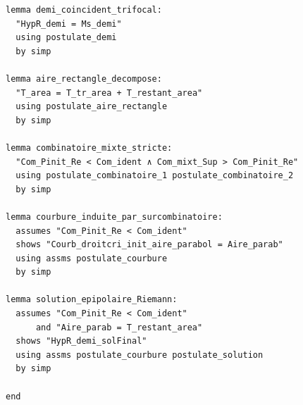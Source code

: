 \documentclass[a4paper,11pt]{article}
\begin{document}
\begin{holcode}[title={\textcolor{white}{Fichier : methode\_spectral.thy -- Partie 1/4}}]
\begin{lstlisting}
lemma demi_coincident_trifocal:
  "HypR_demi = Ms_demi"
  using postulate_demi
  by simp

lemma aire_rectangle_decompose:
  "T_area = T_tr_area + T_restant_area"
  using postulate_aire_rectangle
  by simp

lemma combinatoire_mixte_stricte:
  "Com_Pinit_Re < Com_ident ∧ Com_mixt_Sup > Com_Pinit_Re"
  using postulate_combinatoire_1 postulate_combinatoire_2
  by simp

lemma courbure_induite_par_surcombinatoire:
  assumes "Com_Pinit_Re < Com_ident"
  shows "Courb_droitcri_init_aire_parabol = Aire_parab"
  using assms postulate_courbure
  by simp

lemma solution_epipolaire_Riemann:
  assumes "Com_Pinit_Re < Com_ident"
      and "Aire_parab = T_restant_area"
  shows "HypR_demi_solFinal"
  using assms postulate_courbure postulate_solution
  by simp

end
\end{lstlisting}
\end{holcode}

\end{document}
